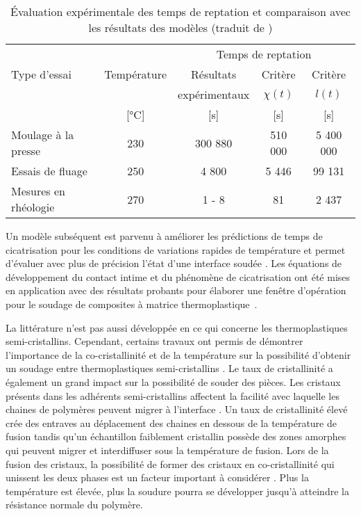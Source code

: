\begin{table}[h]
	\centering
	\caption{Évaluation expérimentale des temps de reptation et comparaison avec les résultats des modèles (traduit de \cite{Bastien1991})}
	\label{tab:temps_de_reptation_Bastien}
	\begin{tabular}{@{}lcccc@{}}
		\toprule
		& \multicolumn{1}{l}{} &          \multicolumn{3}{c}{Temps de reptation}          \\
		Type d'essai         &          Température &      Résultats &          Critère &  Critère \\
		&                      &   expérimentaux & $\chi(t)$ & $l(t)$ \\
		&      [\si{\celsius}] & [\si{\second}] &   [\si{\second}] &       [\si{\second}] \\ \midrule
		Moulage à la presse  &                  230 &        300 880 &          510 000 &            5 400 000 \\
		Essais de fluage     &                  250 &           4 800 &             5 446 &               99 131 \\
		Mesures en rhéologie &                  270 &          1 - 8 &               81 &                 2 437 \\ \bottomrule
	\end{tabular}%
\end{table}

Un modèle subséquent est parvenu à améliorer les prédictions de temps de cicatrisation pour les conditions de variations rapides de température et permet d'évaluer avec plus de précision l'état d'une interface soudée \cite{F.Yang2002}. 
Les équations de développement du contact intime et du phénomène de cicatrisation ont été mises en application avec des résultats probants pour élaborer une fenêtre d'opération pour le soudage de composites à matrice thermoplastique~\cite{Ageorges1998}. 

La littérature n'est pas aussi développée en ce qui concerne les thermoplastiques semi-cristallins. 
Cependant, certains travaux ont permis de démontrer l'importance de la co-cristallinité et de la température sur la possibilité d'obtenir un soudage entre thermoplastiques semi-cristallins  \cite{Xue1998,Smith2001}. 
Le taux de cristallinité a également un grand impact sur la possibilité de souder des pièces. 
Les cristaux présents dans les adhérents semi-cristallins affectent la facilité avec laquelle les chaines de polymères peuvent migrer à l'interface \cite{Jarrousse2004}. 
Un taux de cristallinité élevé crée des entraves au déplacement des chaines en dessous de la température de fusion tandis qu'un échantillon faiblement cristallin possède des zones amorphes qui peuvent migrer et interdiffuser sous la température de fusion. 
Lors de la fusion des cristaux, la possibilité de former des cristaux en co-cristallinité qui unissent les deux phases est un facteur important à considérer \cite{Smith2001,Zanetto2001}. 
Plus la température est élevée, plus la soudure pourra se développer jusqu'à atteindre la résistance normale du polymère. 

